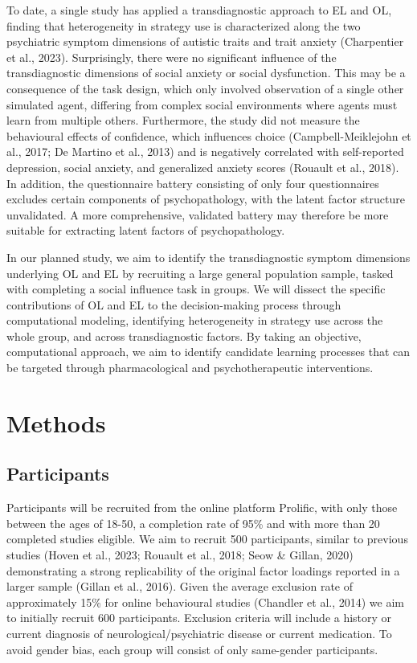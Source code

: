 \documentclass[12pt,a4paper,oneside,]{book} %
\begin{document}
To date, a single study has applied a transdiagnostic approach to EL and OL, finding that heterogeneity in strategy use is characterized along the two psychiatric symptom dimensions of autistic traits and trait anxiety (Charpentier et al., 2023). Surprisingly, there were no significant influence of the transdiagnostic dimensions of social anxiety or social dysfunction. This may be a consequence of the task design, which only involved observation of a single other simulated agent, differing from complex social environments where agents must learn from multiple others. Furthermore, the study did not measure the behavioural effects of confidence, which influences choice (Campbell-Meiklejohn et al., 2017; De Martino et al., 2013) and is negatively correlated with self-reported depression, social anxiety, and generalized anxiety scores (Rouault et al., 2018). In addition, the questionnaire battery consisting of only four questionnaires excludes certain components of psychopathology, with the latent factor structure unvalidated. A more comprehensive, validated battery may therefore be more suitable for extracting latent factors of psychopathology.

In our planned study, we aim to identify the transdiagnostic symptom dimensions underlying OL and EL by recruiting a large general population sample, tasked with completing a social influence task in groups. We will dissect the specific contributions of OL and EL to the decision-making process through computational modeling, identifying heterogeneity in strategy use across the whole group, and across transdiagnostic factors. By taking an objective, computational approach, we aim to identify candidate learning processes that can be targeted through pharmacological and psychotherapeutic interventions.

\section{Methods}\label{methods}

\subsection{Participants}\label{participants}

Participants will be recruited from the online platform Prolific, with only those between the ages of 18-50, a completion rate of 95\% and with more than 20 completed studies eligible. We aim to recruit 500 participants, similar to previous studies (Hoven et al., 2023; Rouault et al., 2018; Seow \& Gillan, 2020) demonstrating a strong replicability of the original factor loadings reported in a larger sample (Gillan et al., 2016). Given the average exclusion rate of approximately 15\% for online behavioural studies (Chandler et al., 2014) we aim to initially recruit 600 participants. Exclusion criteria will include a history or current diagnosis of neurological/psychiatric disease or current medication. To avoid gender bias, each group will consist of only same-gender participants.
\end{document}
